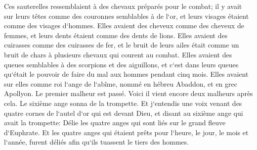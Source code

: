 \verse Ces sauterelles ressemblaient à des chevaux préparés pour le combat; il y avait sur leurs têtes comme des couronnes semblables à de l`or, et leurs visages étaient comme des visages d`hommes. 
\verse Elles avaient des cheveux comme des cheveux de femmes, et leurs dents étaient comme des dents de lions. 
\verse Elles avaient des cuirasses comme des cuirasses de fer, et le bruit de leurs ailes était comme un bruit de chars à plusieurs chevaux qui courent au combat. 
\verse Elles avaient des queues semblables à des scorpions et des aiguillons, et c`est dans leurs queues qu`était le pouvoir de faire du mal aux hommes pendant cinq mois. 
\verse Elles avaient sur elles comme roi l`ange de l`abîme, nommé en hébreu Abaddon, et en grec Apollyon. 
\verse Le premier malheur est passé. Voici il vient encore deux malheurs après cela. 
\verse Le sixième ange sonna de la trompette. Et j`entendis une voix venant des quatre cornes de l`autel d`or qui est devant Dieu, 
\verse et disant au sixième ange qui avait la trompette: Délie les quatre anges qui sont liés sur le grand fleuve d`Euphrate. 
\verse Et les quatre anges qui étaient prêts pour l`heure, le jour, le mois et l`année, furent déliés afin qu`ils tuassent le tiers des hommes. 
